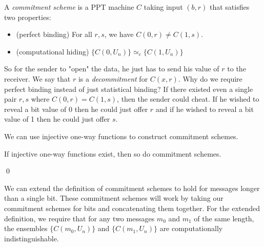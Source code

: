 \documentclass[12pt]{tufte-book}
\begin{document}
\begin{definition}
A \emph{commitment scheme} is a PPT machine $C$ taking input $(b,r)$ that satisfies two properties: \begin{itemize}
\item (perfect binding) For all $r, s$, we have $C(0,r) \neq C(1,s)$.

\item (computational hiding) $\{ C(0, U_n) \} \simeq_c \{ C(1, U_n) \}$

\end{itemize}
\end{definition}

So for the sender to "open" the data, he just has to send his value of $r$ to the receiver. We say that $r$ is a \emph{decommitment} for $C(x,r)$. Why do we require perfect binding instead of just statistical binding? If there existed even a single pair $r, s$ where $C(0,r) = C(1,s)$, then the sender could cheat. If he wished to reveal a bit value of 0 then he could just offer $r$ and if he wished to reveal a bit value of 1 then he could just offer $s$.

We can use injective one-way functions to construct commitment schemes.

\begin{theorem}
If injective one-way functions exist, then so do commitment schemes.
\end{theorem}
\qed

\medskip
We can extend the definition of commitment schemes to hold for messages longer than a single bit. These commitment schemes will work by taking our commitment schemes for bits and concatenating them together. For the extended definition, we require that for any two messages $m_0$ and $m_1$ of the same length, the ensembles $\{ C(m_0, U_n) \}$ and $\{ C(m_1, U_n) \}$ are computationally indistinguishable.
\end{document}
